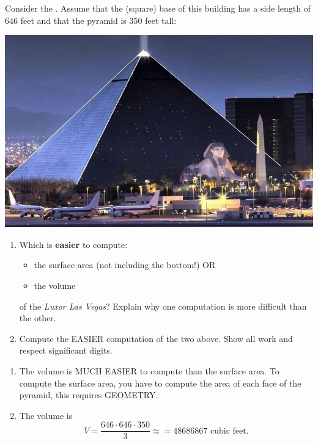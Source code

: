 \documentclass[handout,nooutcomes,noauthor,hints1,12pt]{ximera}
\begin{document}
 \begin{question}   Consider the .  Assume that the (square) base of this building has a side length of
 $646$ feet and that the pyramid is $350$ feet tall:
  \begin{center}
    \includegraphics[width=.4\textwidth]{pyramid.jpg} 
  \end{center}

  \begin{enumerate}
  \item Which is \textbf{easier} to compute:
    \begin{itemize}
    \item the surface area (not including the bottom!) OR
    \item the volume
    \end{itemize}
    of the \textit{Luxor Las Vegas}?
    Explain why one computation is more difficult than the other.
    \item Compute the EASIER computation of the two above. Show all
      work and respect significant digits.
  \end{enumerate}

   \begin{freeResponse}
    \begin{enumerate}
      \item The volume is MUCH EASIER to compute than the surface
        area. To compute the surface area, you have to compute the
        area of each face of the pyramid, this requires GEOMETRY.

      \item The volume is
        \[
        V = \frac{646\cdot 646\cdot 350}{3} \approx = 48686867 \text{ cubic feet}.
        \]
    \end{enumerate}
  \end{freeResponse}
\end{question}

\mynewpage
\end{document}
